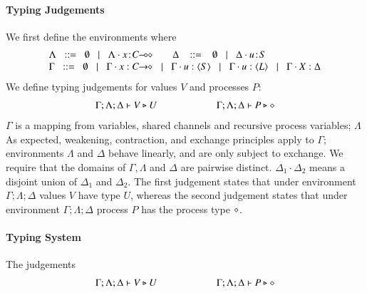 \paragraph{Typing Judgements}
We first define the environments where  
\[
\begin{array}{l}
 \Lambda \bnfis  \emptyset \bnfbar \Lambda \cat \AT{x}{\lhot{C}}
\quad\quad \Delta  \ \bnfis  \ \emptyset \bnfbar \Delta \cat \AT{u}{S} \\
 \Gamma  \bnfis  \emptyset \bnfbar \Gamma \cat \varp{x}: \shot{C} \bnfbar \Gamma \cat u: \chtype{S} \bnfbar \Gamma \cat u: \chtype{L} 
        \bnfbar \Gamma \cat \rvar{X}: \Delta
\end{array}
\]
\noi We define typing judgements for values $V$
and processes $P$:
%
\[	\begin{array}{c}
		\Gamma; \Lambda; \Delta \vdash V \triangleright U \qquad \qquad \qquad \Gamma; \Lambda; \Delta \vdash P \triangleright \diamond
	\end{array}
\]
%
\noi 
$\Gamma$ is a mapping from variables, shared channels and recursive 
process variables;  $\Lambda$ 
As expected, weakening, contraction, and exchange principles apply to
$\Gamma$; environments $\Lambda$ and $\Delta$ behave linearly, and are
only subject to exchange.  We require that the domains of $\Gamma,
\Lambda$ and $\Delta$ are pairwise distinct. $\Delta_1\cdot \Delta_2$ means 
a disjoint union of $\Delta_1$ and $\Delta_2$.  The first judgement
states that under environment $\Gamma; \Lambda; \Delta$ values $V$
have type $U$, whereas the second judgement states that under
environment $\Gamma; \Lambda; \Delta$ process $P$ has the process type
$\diamond$.


\paragraph{Typing System}
The judgements 
\[	\begin{array}{c}
	\Gamma; \Lambda; \Delta \vdash V \triangleright U \qquad \qquad \qquad \Gamma; \Lambda; \Delta \vdash P \triangleright \diamond
	\end{array}
\]

